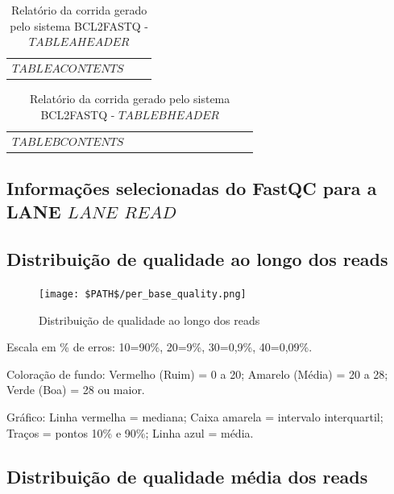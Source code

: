 \documentclass[a4paper]{article}
\begin{document}
\begin{table}[!ht]
\centering
\footnotesize
\caption{Relatório da corrida gerado pelo sistema BCL2FASTQ - $TABLEAHEADER$}
\label{TabRelA}
\begin{tabular}{|l|l|l|} \hline
$TABLEACONTENTS$
\end{tabular}
\end{table}

\begin{tiny}
\begin{longtable}{|l|l|l|l|l|l|l|l|l|l|l|l|}
\caption{Relatório da corrida gerado pelo sistema BCL2FASTQ - $TABLEBHEADER$}
\label{TabRelB}
\endfirsthead
\hline
$TABLEBCONTENTS$
\end{longtable}
\end{tiny}


\begin{center}
\section*{Informações selecionadas do FastQC para a LANE $LANE$ $READ$}
\end{center}

\subsection*{Distribuição de qualidade ao longo dos reads}

\begin{figure}[!htbp]
\centering
\texttt{[image: \$PATH\$/per\_base\_quality.png]}
\caption{Distribuição de qualidade ao longo dos reads}
\label{FigQualidadeReads}
\end{figure}

Escala em \% de erros: 10=90\%, 20=9\%, 30=0,9\%, 40=0,09\%.

Coloração de fundo: Vermelho (Ruim) = 0 a 20; Amarelo (Média) = 20 a 28; Verde (Boa) = 28 ou maior.

Gráfico:
Linha vermelha = mediana;
Caixa amarela = intervalo interquartil;
Traços = pontos 10\% e 90\%;
Linha azul = média.

\subsection*{Distribuição de qualidade média dos reads}
\end{document}

